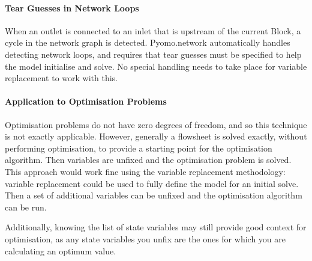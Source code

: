 \hypertarget{tear-guesses-in-network-loops}{%
\paragraph{Tear Guesses in Network
Loops}\label{tear-guesses-in-network-loops}}

When an outlet is connected to an inlet that is upstream of the current
Block, a cycle in the network graph is detected. Pyomo.network
automatically handles detecting network loops, and requires that tear
guesses must be specified to help the model initialise and solve. No
special handling needs to take place for variable replacement to work
with this.

\hypertarget{application-to-optimisation-problems}{%
\paragraph{Application to Optimisation
Problems}\label{application-to-optimisation-problems}}

Optimisation problems do not have zero degrees of freedom, and so this
technique is not exactly applicable. However, generally a flowsheet is
solved exactly, without performing optimisation, to provide a starting
point for the optimisation algorithm. Then variables are unfixed and the
optimisation problem is solved. This approach would work fine using the
variable replacement methodology: variable replacement could be used to
fully define the model for an initial solve. Then a set of additional
variables can be unfixed and the optimisation algorithm can be run.

Additionally, knowing the list of state variables may still provide good
context for optimisation, as any state variables you unfix are the ones
for which you are calculating an optimum value.

\newpage
